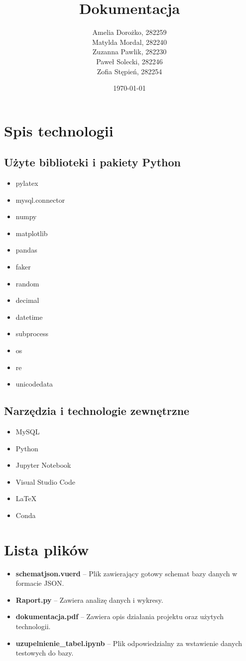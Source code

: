 \documentclass{article}
\title{Dokumentacja}
\author{Amelia Dorożko, 282259 \\
	Matylda Mordal, 282240 \\ 
	Zuzanna Pawlik, 282230 \\ 
	Paweł Solecki, 282246 \\ 
	Zofia Stępień, 282254}
\date{\today}
\theoremstyle{definition}
\begin{document}
	
	\maketitle
	
	\section{Spis technologii}
	
	\subsection{Użyte biblioteki i pakiety Python}
	\begin{itemize}
		\item pylatex
		\item mysql.connector
		\item numpy
		\item matplotlib
		\item pandas
		\item faker
		\item random
		\item decimal
		\item datetime
		\item subprocess
		\item os
		\item re
		\item unicodedata
	\end{itemize}
	
	\subsection{Narzędzia i technologie zewnętrzne}
	\begin{itemize}
		\item MySQL
		\item Python
		\item Jupyter Notebook
		\item Visual Studio Code
		\item LaTeX
		\item Conda
	\end{itemize}
	
	\section{Lista plików}
	\begin{itemize}
		\item \textbf{schematjson.vuerd} -- Plik zawierający gotowy schemat bazy danych w formacie JSON.
		\item \textbf{Raport.py} -- Zawiera analizę danych i wykresy.
		\item \textbf{dokumentacja.pdf} -- Zawiera opis działania projektu oraz użytych technologii.
		\item \textbf{uzupelnienie\_tabel.ipynb} -- Plik odpowiedzialny za wstawienie danych testowych do bazy.
	\end{itemize}
	
\end{document}
